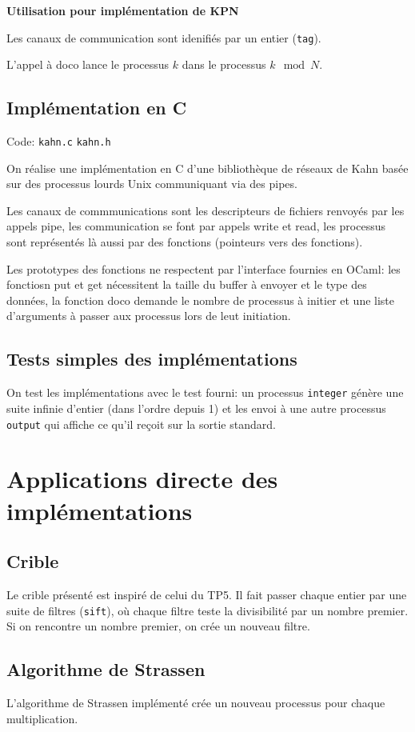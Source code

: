 \documentclass[a4paper]{article}
\begin{document}
\textbf{Utilisation pour implémentation de KPN}

Les canaux de communication sont idenifiés par un entier (\verb|tag|).

L'appel à doco lance le processus $k$ dans le processus $k\mod{N}$.


\subsection{Implémentation en C}

Code: \verb|kahn.c| \verb|kahn.h|

On réalise une implémentation en C d'une bibliothèque de réseaux de Kahn basée sur des processus lourds Unix communiquant via des pipes.

Les canaux de commmunications sont les descripteurs de fichiers renvoyés par les appels pipe, les communication se font par appels write et read, les processus sont représentés là aussi par des fonctions (pointeurs vers des fonctions).

Les prototypes des fonctions ne respectent par l'interface fournies en OCaml: les fonctiosn put et get nécessitent la taille du buffer à envoyer et le type des données, la fonction doco demande le nombre de processus à initier et une liste d'arguments à passer aux processus lors de leut initiation.

\subsection{Tests simples des implémentations}

On test les implémentations avec le test fourni: un processus \verb|integer| génère une suite infinie d'entier (dans l'ordre depuis 1) et les envoi à une autre processus \verb|output| qui affiche ce qu'il reçoit sur la sortie standard.

\section{Applications directe des implémentations}
\subsection{Crible}
Le crible présenté est inspiré de celui du TP5. Il fait passer chaque entier par une suite de filtres (\texttt{sift}), où chaque filtre teste la divisibilité par un nombre premier. Si on rencontre un nombre premier, on crée un nouveau filtre.
\subsection{Algorithme de Strassen}
L'algorithme de Strassen implémenté crée un nouveau processus pour chaque multiplication.
\end{document}
